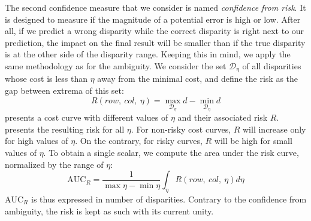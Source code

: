 The second confidence measure that we consider is named \textit{confidence from risk}. It is designed to measure if the magnitude of a potential error is high or low. After all, if we predict a wrong disparity while the correct disparity is right next to our prediction, the impact on the final result will be smaller than if the true disparity is at the other side of the disparity range. Keeping this in mind, we apply the same methodology as for the ambiguity. We consider the set $\mathcal{D}_\eta$ of all disparities whose cost is less than $\eta$ away from the minimal cost, and define the risk as the gap between extrema of this set:
\begin{equation}
    R(row, ~col, ~\eta) = \max_{\mathcal{D}_\eta}d - \min_{\mathcal{D}_\eta}d
\end{equation}
 presents a cost curve with different values of $\eta$ and their associated risk $R$.  presents the resulting risk for all $\eta$. For non-risky cost curves, $R$ will increase only for high values of $\eta$. On the contrary, for risky curves, $R$ will be high for small values of $\eta$. To obtain a single scalar, we compute the area under the risk curve, normalized by the range of $\eta$:
\begin{equation}
    \mathrm{AUC}_R = \frac{1}{\max\eta-\min\eta}\int_\eta R(row,~col,~\eta)d\eta
\end{equation}
$\mathrm{AUC}_R$ is thus expressed in number of disparities. Contrary to the confidence from ambiguity, the risk is kept as such with its current unity. 

